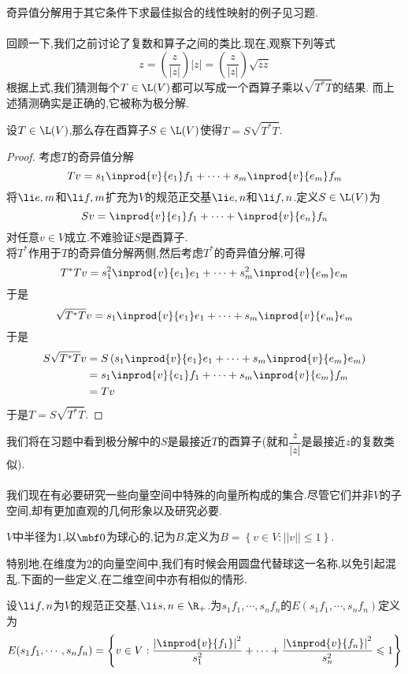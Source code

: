 \documentclass{ctexart}
\begin{document}
奇异值分解用于其它条件下求最佳拟合的线性映射的例子见习题.\\
\\
回顾一下,我们之前讨论了复数和算子之间的类比.现在,观察下列等式
\[z=\left(\dfrac{z}{|z|}\right)|z|=\left(\dfrac{z}{|z|}\right)\sqrt{\overline{z}z}\]
根据上式,我们猜测每个$T\in\L(V)$都可以写成一个酉算子乘以$\sqrt{T^*T}$的结果.%
而上述猜测确实是正确的,它被称为极分解.
\begin{formal}[3.1 极分解]
    设$T\in\L(V)$,那么存在酉算子$S\in\L(V)$使得$T=S\sqrt{T^*T}$.
\end{formal}
\begin{proof}
    考虑$T$的奇异值分解
    \[Tv=s_1\inprod{v}{e_1}f_1+\cdots+s_m\inprod{v}{e_m}f_m\]
    将$\li e,m$和$\li f,m$扩充为$V$的规范正交基$\li e,n$和$\li f,n$.定义$S\in\L(V)$为
    \[Sv=\inprod{v}{e_1}f_1+\cdots+\inprod{v}{e_n}f_n\]
    对任意$v\in V$成立.不难验证$S$是酉算子.\\
    将$T^*$作用于$T$的奇异值分解两侧,然后考虑$T^*$的奇异值分解,可得
    \[T^*Tv=s_1^2\inprod{v}{e_1}e_1+\cdots+s_m^2\inprod{v}{e_m}e_m\]
    于是
    \[\sqrt{T^*T}v=s_1\inprod{v}{e_1}e_1+\cdots+s_m\inprod{v}{e_m}e_m\]
    于是
    \[\begin{aligned}
        S\sqrt{T^*T}v
        &= S\left(s_1\inprod{v}{e_1}e_1+\cdots+s_m\inprod{v}{e_m}e_m\right) \\
        &= s_1\inprod{v}{e_1}f_1+\cdots+s_m\inprod{v}{e_m}f_m \\
        &= Tv
    \end{aligned}\]
    于是$T=S\sqrt{T^*T}$.
\end{proof}\noindent
我们将在习题中看到极分解中的$S$是最接近$T$的酉算子(就和$\dfrac{z}{|z|}$是最接近$z$的复数类似).\\
\\
我们现在有必要研究一些向量空间中特殊的向量所构成的集合.尽管它们并非$V$的子空间,却有更加直观的几何形象以及研究必要.
\begin{definition}[4.1 定义:球]
    $V$中半径为$1$,以$\mbf0$为球心的,记为$B$,定义为$B=\left\{v\in V:||v||\leqslant1\right\}$.
\end{definition}\noindent
特别地,在维度为$2$的向量空间中,我们有时候会用圆盘代替球这一名称,以免引起混乱.下面的一些定义,在二维空间中亦有相似的情形.
\begin{definition}[4.2 定义:椭球]
    设$\li f,n$为$V$的规范正交基,$\li s,n\in\R_+$.为$s_1f_1,\cdots,s_nf_n$的$E(s_1f_1,\cdots,s_nf_n)$定义为
    \[E(s_1f_1,\cdots,s_nf_n)=\left\{v\in V:\dfrac{\left|\inprod{v}{f_1}\right|^2}{s_1^2}+\cdots+\dfrac{\left|\inprod{v}{f_n}\right|^2}{s_n^2}\leqslant1\right\}\]
\end{definition}\noindent
\end{document}
